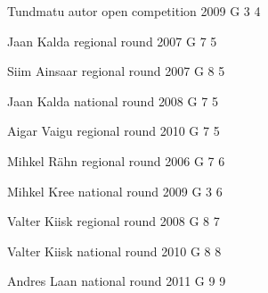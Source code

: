 \documentclass[11pt]{article}
\begin{document}
\ylDisplay{} %
{Tundmatu autor} %
{open competition} %
{2009} %
{G 3} %
{4} %
{

\ifEngSolution
\fi
}

\ylDisplay{} %
{Jaan Kalda} %
{regional round} %
{2007} %
{G 7} %
{5} %
{

\ifEngSolution
\fi
}

\ylDisplay{} %
{Siim Ainsaar} %
{regional round} %
{2007} %
{G 8} %
{5} %
{

\ifEngSolution
\fi
}

\ylDisplay{} %
{Jaan Kalda} %
{national round} %
{2008} %
{G 7} %
{5} %
{

\ifEngSolution
\fi
}

\ylDisplay{} %
{Aigar Vaigu} %
{regional round} %
{2010} %
{G 7} %
{5} %
{

\ifEngSolution
\fi
}

\ylDisplay{} %
{Mihkel Rähn} %
{regional round} %
{2006} %
{G 7} %
{6} %
{

\ifEngSolution
\fi
}

\ylDisplay{} %
{Mihkel Kree} %
{national round} %
{2009} %
{G 3} %
{6} %
{

\ifEngSolution
\fi
}

\ylDisplay{} %
{Valter Kiisk} %
{regional round} %
{2008} %
{G 8} %
{7} %
{

\ifEngSolution
\fi
}

\ylDisplay{} %
{Valter Kiisk} %
{national round} %
{2010} %
{G 8} %
{8} %
{

\ifEngSolution
\fi
}

\ylDisplay{} %
{Andres Laan} %
{national round} %
{2011} %
{G 9} %
{9} %
{

\ifEngSolution
\fi
}
\end{document}
